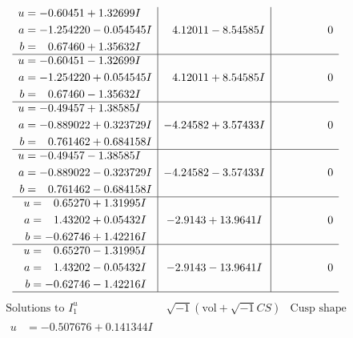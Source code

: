 \documentclass[1p]{elsarticle_modified}
\theoremstyle{definition}
\newcommand{\I}{\sqrt{-1}}
\begin{document}
$$\begin{array}{c|c|c}
\begin{aligned}
u &= -0.60451 + 1.32699 I \\
a &= -1.254220 - 0.054545 I \\
b &= \phantom{-}0.67460 + 1.35632 I\end{aligned}
 & \phantom{-}4.12011 - 8.54585 I & \phantom{-0.000000 } 0 \\ \hline\begin{aligned}
u &= -0.60451 - 1.32699 I \\
a &= -1.254220 + 0.054545 I \\
b &= \phantom{-}0.67460 - 1.35632 I\end{aligned}
 & \phantom{-}4.12011 + 8.54585 I & \phantom{-0.000000 } 0 \\ \hline\begin{aligned}
u &= -0.49457 + 1.38585 I \\
a &= -0.889022 + 0.323729 I \\
b &= \phantom{-}0.761462 + 0.684158 I\end{aligned}
 & -4.24582 + 3.57433 I & \phantom{-0.000000 } 0 \\ \hline\begin{aligned}
u &= -0.49457 - 1.38585 I \\
a &= -0.889022 - 0.323729 I \\
b &= \phantom{-}0.761462 - 0.684158 I\end{aligned}
 & -4.24582 - 3.57433 I & \phantom{-0.000000 } 0 \\ \hline\begin{aligned}
u &= \phantom{-}0.65270 + 1.31995 I \\
a &= \phantom{-}1.43202 + 0.05432 I \\
b &= -0.62746 + 1.42216 I\end{aligned}
 & -2.9143 + 13.9641 I & \phantom{-0.000000 } 0 \\ \hline\begin{aligned}
u &= \phantom{-}0.65270 - 1.31995 I \\
a &= \phantom{-}1.43202 - 0.05432 I \\
b &= -0.62746 - 1.42216 I\end{aligned}
 & -2.9143 - 13.9641 I & \phantom{-0.000000 } 0\\
 \hline 
 \end{array}$$\newpage$$\begin{array}{c|c|c}  
\text{Solutions to }I^u_{1}& \I (\text{vol} + \sqrt{-1}CS) & \text{Cusp shape}\\
 \hline 
\begin{aligned}
u &= -0.507676 + 0.141344 I \\

\end{aligned}
\end{array}$$
\end{document}
